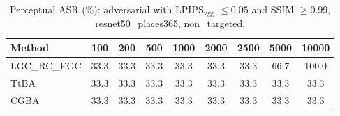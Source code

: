 \begin{table}[t]
\centering\footnotesize
\caption{Perceptual ASR (\%): adversarial with LPIPS$_{\mathrm{vgg}}$ $\le 0.05$ and SSIM $\ge 0.99$, resnet50\_places365, non\_targeted.}
\begin{tabular}{lcccccccc}
\toprule
Method & 100 & 200 & 500 & 1000 & 2000 & 2500 & 5000 & 10000 \\
\midrule
LGC\_RC\_EGC & 33.3 & 33.3 & 33.3 & 33.3 & 33.3 & 33.3 & 66.7 & 100.0 \\
TtBA & 33.3 & 33.3 & 33.3 & 33.3 & 33.3 & 33.3 & 33.3 & 33.3 \\
CGBA & 33.3 & 33.3 & 33.3 & 33.3 & 33.3 & 33.3 & 33.3 & 33.3 \\
\bottomrule
\end{tabular}
\end{table}
